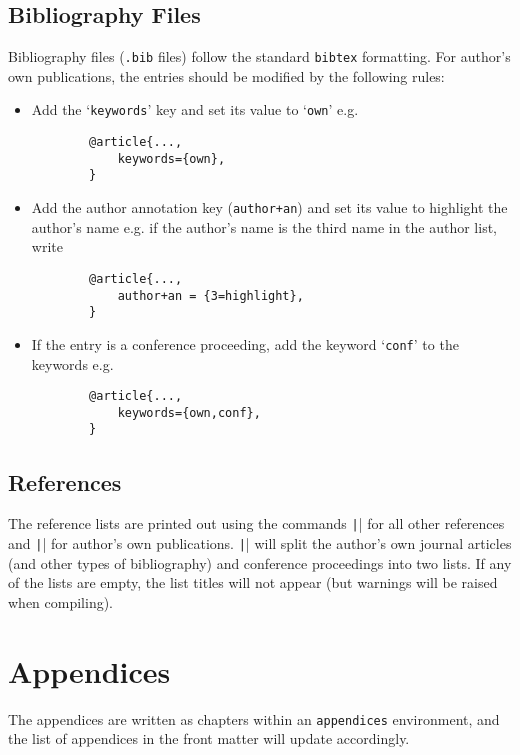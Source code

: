 \documentclass{umalayathesis}
\begin{document}
\subsection{Bibliography Files}

Bibliography files (\texttt{.bib} files) follow the standard \texttt{bibtex} formatting. For author's own publications, the entries should be modified by the following rules:

\begin{itemize}
    \item Add the `\texttt{keywords}' key and set its value to `\texttt{own}' e.g.
    \begin{verbatim}
        @article{...,
            keywords={own},
        }
    \end{verbatim}
    \item Add the author annotation key (\texttt{author+an}) and set its value to highlight the author's name e.g. if the author's name is the third name in the author list, write 
    \begin{verbatim}
        @article{...,
            author+an = {3=highlight},
        }
    \end{verbatim}
    \item If the entry is a conference proceeding, add the keyword `\texttt{conf}' to the keywords e.g.
    \begin{verbatim}
        @article{...,
            keywords={own,conf},
        }
    \end{verbatim}
\end{itemize}

\subsection{References}

The reference lists are printed out using the commands \texttt|| for all other references and \texttt|\ownreferences| for author's own publications. \texttt|\ownreferences| will split the author's own journal articles (and other types of bibliography) and conference proceedings into two lists. If any of the lists are empty, the list titles will not appear (but warnings will be raised when compiling).

\section{Appendices}

The appendices are written as chapters within an \texttt{appendices} environment, and the list of appendices in the front matter will update accordingly. 
\end{document}
